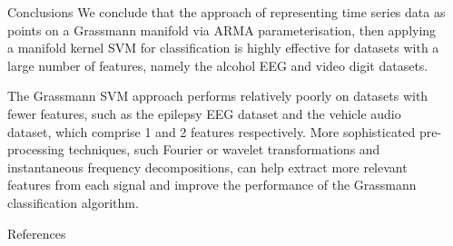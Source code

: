 \documentclass[final]{beamer}
\newlength{\sepwid}
\newlength{\onecolwid}
\begin{document}
\begin{frame}[t]
\begin{columns}[t]
\begin{column}{\sepwid}\end{column} %

\begin{column}{\onecolwid} %


\begin{block}{Conclusions}
    We conclude that the approach of representing time series data as points on a Grassmann manifold
    via ARMA parameterisation, then applying a manifold kernel SVM for classification is highly
    effective for datasets with a large number of features, namely the alcohol EEG and video digit
    datasets.

    The Grassmann SVM approach performs relatively poorly on datasets with fewer features, such as
    the epilepsy EEG dataset and the vehicle audio dataset, which comprise 1 and 2 features
    respectively. More sophisticated pre-processing techniques, such Fourier or wavelet
    transformations and instantaneous frequency decompositions, can help extract more relevant
    features from each signal and improve the performance of the Grassmann classification algorithm.
\end{block}


\begin{block}{References}

\footnotesize{
\vspace{0.75in}}

\end{block}


\end{column}    %



\end{columns}
\end{frame}
\end{document}
